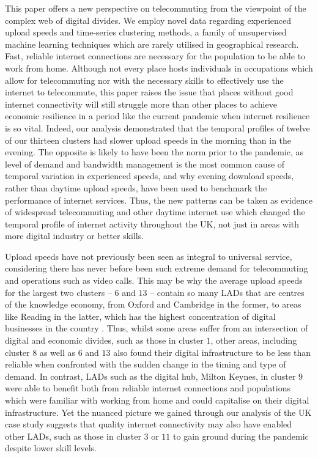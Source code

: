 \documentclass[]{interact}
\theoremstyle{plain}%
\theoremstyle{definition}
\theoremstyle{remark}
\begin{document}
This paper offers a new perspective on telecommuting from the viewpoint
of the complex web of digital divides. We employ novel data regarding
experienced upload speeds and time-series clustering methods, a family
of unsupervised machine learning techniques which are rarely utilised in
geographical research. Fast, reliable internet connections are necessary
for the population to be able to work from home. Although not every
place hosts individuals in occupations which allow for telecommuting nor
with the necessary skills to effectively use the internet to
telecommute, this paper raises the issue that places without good
internet connectivity will still struggle more than other places to
achieve economic resilience in a period like the current pandemic when
internet resilience is so vital. Indeed, our analysis demonstrated that
the temporal profiles of twelve of our thirteen clusters had slower
upload speeds in the morning than in the evening. The opposite is likely
to have been the norm prior to the pandemic, as level of demand and
bandwidth management is the most common cause of temporal variation in
experienced speeds, and why evening download speeds, rather than daytime
upload speeds, have been used to benchmark the performance of internet
services. Thus, the new patterns can be taken as evidence of widespread
telecommuting and other daytime internet use which changed the temporal
profile of internet activity throughout the UK, not just in areas with
more digital industry or better skills.

Upload speeds have not previously been seen as integral to universal
service, considering there has never before been such extreme demand for
telecommuting and operations such as video calls. This may be why the
average upload speeds for the largest two clusters -- \(6\) and \(13\)
-- contain so many LADs that are centres of the knowledge economy, from
Oxford and Cambridge in the former, to areas like Reading in the latter,
which has the highest concentration of digital businesses in the country
\citep{technation2017}. Thus, whilst some areas suffer from an
intersection of digital and economic divides, such as those in cluster
\(1\), other areas, including cluster \(8\) as well as \(6\) and \(13\)
also found their digital infrastructure to be less than reliable when
confronted with the sudden change in the timing and type of demand. In
contrast, LADs such as the digital hub, Milton Keynes, in cluster \(9\)
were able to benefit both from reliable internet connections and
populations which were familiar with working from home and could
capitalise on their digital infrastructure. Yet the nuanced picture we
gained through our analysis of the UK case study suggests that quality
internet connectivity may also have enabled other LADs, such as those in
cluster \(3\) or \(11\) to gain ground during the pandemic despite lower
skill levels.
\end{document}
